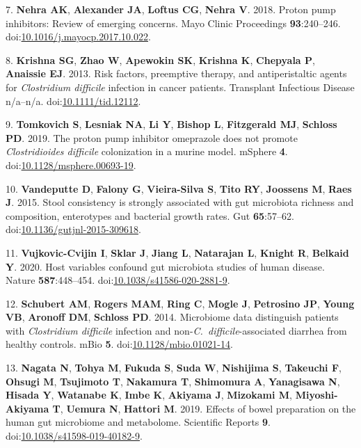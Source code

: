 \documentclass[
  11pt,
]{article}
\begin{document}
\leavevmode\hypertarget{ref-Nehra2018}{}%
7. \textbf{Nehra AK}, \textbf{Alexander JA}, \textbf{Loftus CG},
\textbf{Nehra V}. 2018. Proton pump inhibitors: Review of emerging
concerns. Mayo Clinic Proceedings \textbf{93}:240--246.
doi:\href{https://doi.org/10.1016/j.mayocp.2017.10.022}{10.1016/j.mayocp.2017.10.022}.

\leavevmode\hypertarget{ref-Krishna2013}{}%
8. \textbf{Krishna SG}, \textbf{Zhao W}, \textbf{Apewokin SK},
\textbf{Krishna K}, \textbf{Chepyala P}, \textbf{Anaissie EJ}. 2013.
Risk factors, preemptive therapy, and antiperistaltic agents for
\emph{Clostridium difficile} infection in cancer patients. Transplant
Infectious Disease n/a--n/a.
doi:\href{https://doi.org/10.1111/tid.12112}{10.1111/tid.12112}.

\leavevmode\hypertarget{ref-Tomkovich2019}{}%
9. \textbf{Tomkovich S}, \textbf{Lesniak NA}, \textbf{Li Y},
\textbf{Bishop L}, \textbf{Fitzgerald MJ}, \textbf{Schloss PD}. 2019.
The proton pump inhibitor omeprazole does not promote
\emph{Clostridioides difficile} colonization in a murine model. mSphere
\textbf{4}.
doi:\href{https://doi.org/10.1128/msphere.00693-19}{10.1128/msphere.00693-19}.

\leavevmode\hypertarget{ref-Vandeputte2015}{}%
10. \textbf{Vandeputte D}, \textbf{Falony G}, \textbf{Vieira-Silva S},
\textbf{Tito RY}, \textbf{Joossens M}, \textbf{Raes J}. 2015. Stool
consistency is strongly associated with gut microbiota richness and
composition, enterotypes and bacterial growth rates. Gut
\textbf{65}:57--62.
doi:\href{https://doi.org/10.1136/gutjnl-2015-309618}{10.1136/gutjnl-2015-309618}.

\leavevmode\hypertarget{ref-VujkovicCvijin2020}{}%
11. \textbf{Vujkovic-Cvijin I}, \textbf{Sklar J}, \textbf{Jiang L},
\textbf{Natarajan L}, \textbf{Knight R}, \textbf{Belkaid Y}. 2020. Host
variables confound gut microbiota studies of human disease. Nature
\textbf{587}:448--454.
doi:\href{https://doi.org/10.1038/s41586-020-2881-9}{10.1038/s41586-020-2881-9}.

\leavevmode\hypertarget{ref-Schubert2014}{}%
12. \textbf{Schubert AM}, \textbf{Rogers MAM}, \textbf{Ring C},
\textbf{Mogle J}, \textbf{Petrosino JP}, \textbf{Young VB},
\textbf{Aronoff DM}, \textbf{Schloss PD}. 2014. Microbiome data
distinguish patients with \emph{Clostridium difficile} infection and
non-\emph{C.~difficile}-associated diarrhea from healthy controls. mBio
\textbf{5}.
doi:\href{https://doi.org/10.1128/mbio.01021-14}{10.1128/mbio.01021-14}.

\leavevmode\hypertarget{ref-Nagata2019}{}%
13. \textbf{Nagata N}, \textbf{Tohya M}, \textbf{Fukuda S}, \textbf{Suda
W}, \textbf{Nishijima S}, \textbf{Takeuchi F}, \textbf{Ohsugi M},
\textbf{Tsujimoto T}, \textbf{Nakamura T}, \textbf{Shimomura A},
\textbf{Yanagisawa N}, \textbf{Hisada Y}, \textbf{Watanabe K},
\textbf{Imbe K}, \textbf{Akiyama J}, \textbf{Mizokami M},
\textbf{Miyoshi-Akiyama T}, \textbf{Uemura N}, \textbf{Hattori M}. 2019.
Effects of bowel preparation on the human gut microbiome and metabolome.
Scientific Reports \textbf{9}.
doi:\href{https://doi.org/10.1038/s41598-019-40182-9}{10.1038/s41598-019-40182-9}.
\end{document}
